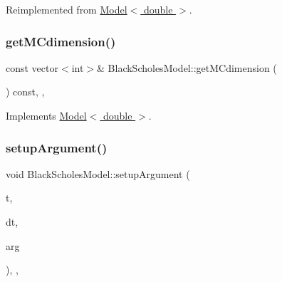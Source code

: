 Reimplemented from \hyperlink{class_model_a18b1fe1476b5adde8d6125e7f6a7f932}{Model$<$ double $>$}.

\hypertarget{class_black_scholes_model_a5665e6ea247e4f243082f5c98bbdbad6}{}\label{class_black_scholes_model_a5665e6ea247e4f243082f5c98bbdbad6} 
\subsubsection{\texorpdfstring{get\+M\+Cdimension()}{getMCdimension()}}
{\footnotesize\ttfamily const vector$<$int$>$\& Black\+Scholes\+Model\+::get\+M\+Cdimension (\begin{DoxyParamCaption}{ }\end{DoxyParamCaption}) const\hspace{0.3cm}{\ttfamily [inline]}, {\ttfamily [override]}, {\ttfamily [virtual]}}



Implements \hyperlink{class_model_a11fb36244c91ca8c36317581b73bca08}{Model$<$ double $>$}.

\hypertarget{class_black_scholes_model_a04a6ba4c59cd70a92dedbeb482e9d5aa}{}\label{class_black_scholes_model_a04a6ba4c59cd70a92dedbeb482e9d5aa} 
\subsubsection{\texorpdfstring{setup\+Argument()}{setupArgument()}}
{\footnotesize\ttfamily void Black\+Scholes\+Model\+::setup\+Argument (\begin{DoxyParamCaption}\item[{\hyperlink{_name_def_8h_ac2d3e0ba793497bcca555c7c2cf64ff3}{Time}}]{t,  }\item[{\hyperlink{_name_def_8h_ac2d3e0ba793497bcca555c7c2cf64ff3}{Time}}]{dt,  }\item[{\hyperlink{class_generic_random_variable_generator_1_1_argument}{Generic\+Random\+Variable\+Generator\+::\+Argument} $\ast$}]{arg }\end{DoxyParamCaption})\hspace{0.3cm}{\ttfamily [inline]}, {\ttfamily [override]}, {\ttfamily [virtual]}}



